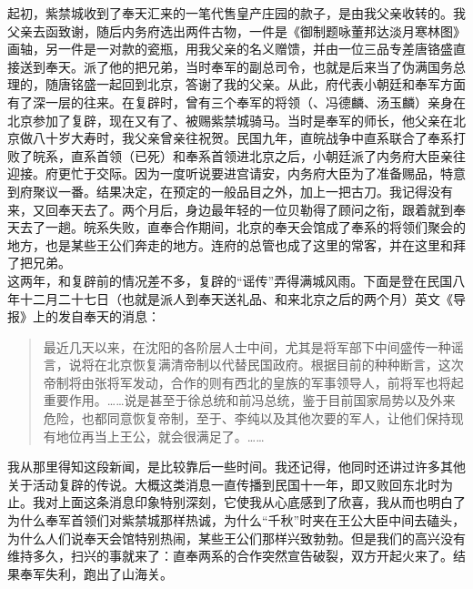 起初，紫禁城收到了奉天汇来的一笔代售皇产庄园的款子，是由我父亲收转的。我父亲去函致谢，随后内务府选出两件古物，一件是《御制题咏董邦达淡月寒林图》画轴，另一件是一对款的瓷瓶，用我父亲的名义赠馈，并由一位三品专差唐铬盛直接送到奉天。派了他的把兄弟，当时奉军的副总司令，也就是后来当了伪满国务总理的，随唐铭盛一起回到北京，答谢了我的父亲。从此，府代表小朝廷和奉军方面有了深一层的往来。在复辟时，曾有三个奉军的将领（、冯德麟、汤玉麟）亲身在北京参加了复辟，现在又有了、被赐紫禁城骑马。当时是奉军的师长，他父亲在北京做八十岁大寿时，我父亲曾亲往祝贺。民国九年，直皖战争中直系联合了奉系打败了皖系，直系首领（已死）和奉系首领进北京之后，小朝廷派了内务府大臣亲往迎接。府更忙于交际。因为一度听说要进宫请安，内务府大臣为了准备赐品，特意到府聚议一番。结果决定，在预定的一般品目之外，加上一把古刀。我记得没有来，又回奉天去了。两个月后，身边最年轻的一位贝勒得了顾问之衔，跟着就到奉天去了一趟。皖系失败，直奉合作期间，北京的奉天会馆成了奉系的将领们聚会的地方，也是某些王公们奔走的地方。连府的总管也成了这里的常客，并在这里和拜了把兄弟。\\

这两年，和复辟前的情况差不多，复辟的“谣传”弄得满城风雨。下面是登在民国八年十二月二十七日（也就是派人到奉天送礼品、和来北京之后的两个月）英文《导报》上的发自奉天的消息：\\

\begin{quote}
	最近几天以来，在沈阳的各阶层人士中间，尤其是将军部下中间盛传一种谣言，说将在北京恢复满清帝制以代替民国政府。根据目前的种种断言，这次帝制将由张将军发动，合作的则有西北的皇族的军事领导人，前将军也将起重要作用。……说是甚至于徐总统和前冯总统，鉴于目前国家局势以及外来危险，也都同意恢复帝制，至于、李纯以及其他次要的军人，让他们保持现有地位再当上王公，就会很满足了。……\\
\end{quote}

我从那里得知这段新闻，是比较靠后一些时间。我还记得，他同时还讲过许多其他关于活动复辟的传说。大概这类消息一直传播到民国十一年，即又败回东北时为止。我对上面这条消息印象特别深刻，它使我从心底感到了欣喜，我从而也明白了为什么奉军首领们对紫禁城那样热诚，为什么“千秋”时夹在王公大臣中间去磕头，为什么人们说奉天会馆特别热闹，某些王公们那样兴致勃勃。但是我们的高兴没有维持多久，扫兴的事就来了：直奉两系的合作突然宣告破裂，双方开起火来了。结果奉军失利，跑出了山海关。\\

